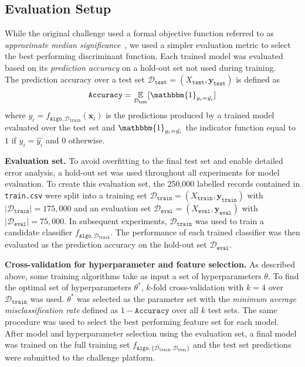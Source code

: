 \documentclass[10pt,conference,compsocconf]{IEEEtran}
\newcommand{\parabf}[1]{\vspace{1mm}\noindent\textbf{#1}}
\newcommand{\Deval}{\mathcal{D}_{\mathtt{eval}}}
\newcommand{\Dtrain}{\mathcal{D}_{\mathtt{train}}}
\newcommand{\Dtest}{\mathcal{D}_{\mathtt{test}}}
\newcommand{\Xtrain}{X_{\mathtt{train}}}
\newcommand{\ytrain}{\mathbf{y}_{\mathtt{train}}}
\newcommand{\Xeval}{X_{\mathtt{eval}}}
\newcommand{\yeval}{\mathbf{y}_{\mathtt{eval}}}
\newcommand{\Xtest}{X_{\mathtt{test}}}
\newcommand{\ytest}{\mathbf{y}_{\mathtt{test}}}
\newcommand{\features}{\mathbf{x}_i}
\newcommand{\target}{y_i}
\newcommand{\classifier}[2]{f_{#1, #2}}
\newcommand{\Train}{\mathtt{Algo}}
\begin{document}
\subsection{Evaluation Setup}
While the original challenge used a formal objective function referred to as \emph{approximate median significance}~\cite{HiggsML}, we used a simpler evaluation metric to select the best performing discriminant function. Each trained model was evaluated based on its \emph{prediction accuracy} on a hold-out set not used during training.\\
The prediction accuracy over a test set $\Dtest = (\Xtest, \ytest)$ is defined as
\begin{equation}
	\mathtt{Accuracy} = \underset{\Dtest}{\mathbb{E}}[ \mathbbm{1}_{\target = \hat{\target}} ]
\end{equation}
where $\hat{\target} = \classifier{\Train}{\Dtrain}(\features)$ is the predictions produced by a trained model evaluated over the test set and $\mathbbm{1}_{\target = \hat{\target}}$ the indicator function equal to $1$ if $\target = \hat{\target}$ and $0$ otherwise.

\parabf{Evaluation set.} To avoid overfitting to the final test set and enable detailed error analysis, a hold-out set was used throughout all experiments for model evaluation. To create this evaluation set, the 250,000 labelled records contained in \texttt{train.csv} were split into a training set $\Dtrain = (\Xtrain, \ytrain)$ with $|\Dtrain| = 175,000$ and an evaluation set $\Deval = (\Xeval, \yeval)$ with $|\Deval| = 75,000$. In subsequent experiments, $\Dtrain$ was used to train a candidate classifier $\classifier{\Train}{\Dtrain}$. The performance of each trained classifier was then evaluated as the prediction accuracy on the hold-out set $\Deval$.

\parabf{Cross-validation for hyperparameter and feature selection.} As described above, some training algorithms take as input a set of hyperparameters $\theta$. To find the optimal set of hyperparameters $\theta^*$, $k$-fold cross-validation with $k=4$ over $\Dtrain$ was used. $\theta^*$ was selected as the parameter set with the \emph{minimum average misclassification rate} defined as $1 - \mathtt{Accuracy}$ over all $k$ test sets. The same procedure was used to select the best performing feature set for each model.\\

After model and hyperparameter selection using the evaluation set, a final model was trained on the full training set
$\classifier{\Train}{\{ \Dtrain, \Deval\}}$ and the test set predictions were submitted to the challenge platform. 
\end{document}
